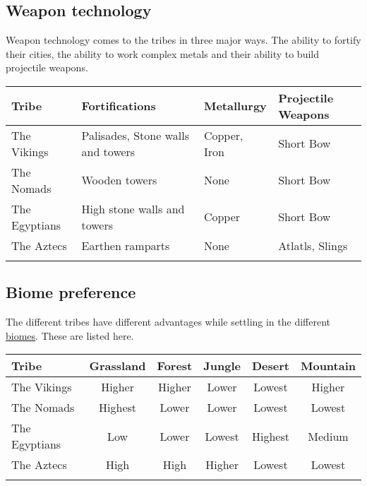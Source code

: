 \begin{landscape}
	\newpage

	\subsection{Weapon technology}
	Weapon technology comes to the tribes in three major ways. The ability to
	fortify their cities, the ability to work complex metals and their ability to
	build projectile weapons.

	\begin{longtable}{p{5cm}p{5cm}p{4cm}p{6cm}}
		\toprule{}
		Tribe
		 & Fortifications
		 & Metallurgy
		 & Projectile Weapons                \\
		\midrule{}
		The \gls{Vikings}
		 & Palisades, Stone walls and towers
		 & Copper, Iron
		 & Short Bow                         \\
		The \gls{Nomads}
		 & Wooden towers
		 & None
		 & Short Bow                         \\
		The \gls{Egyptians}
		 & High stone walls and towers
		 & Copper
		 & Short Bow                         \\
		The \gls{Aztecs}
		 & Earthen ramparts
		 & None
		 & Atlatls, Slings                   \\
		\bottomrule{}
	\end{longtable}

	\subsection{Biome preference}
	The different tribes have different advantages while settling in the different
	\hyperref[sec::biomes]{biomes}. These are listed here.

	\begin{longtable}{p{5cm}ccccc}
		\toprule{}
		Tribe
		 & Grassland
		 & Forest
		 & Jungle
		 & Desert
		 & Mountain  \\
		\midrule{}
		The \gls{Vikings}
		 & Higher
		 & Higher
		 & Lower
		 & Lowest
		 & Higher    \\
		The \gls{Nomads}
		 & Highest
		 & Lower
		 & Lower
		 & Lowest
		 & Lowest    \\
		The \gls{Egyptians}
		 & Low
		 & Lower
		 & Lowest
		 & Highest
		 & Medium    \\
		The \gls{Aztecs}
		 & High
		 & High
		 & Higher
		 & Lowest
		 & Lowest    \\
		\bottomrule{}
	\end{longtable}

\end{landscape}
